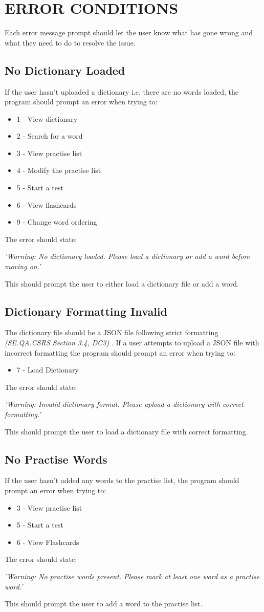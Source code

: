 \documentclass{project}
\begin{document}
\section{ERROR CONDITIONS}
Each error message prompt should let the user know what has gone wrong and what they need to do to resolve the issue.
\subsection{No Dictionary Loaded}
If the user hasn't uploaded a dictionary i.e. there are no words loaded, the program should prompt an error when trying to:
\begin{itemize}
	\item 1 - View dictionary
	\item 2 - Search for a word
	\item 3 - View practise list
	\item 4 - Modify the practise list
	\item 5 - Start a test
	\item 6 - View flashcards
	\item 9 - Change word ordering
\end{itemize}
The error should state:
\begin{center}
	\emph{'Warning: No dictionary loaded. Please load a dictionary or add a word before moving on.'}
\end{center}
This should prompt the user to either load a dictionary file or add a word.
\subsection{Dictionary Formatting Invalid}
The dictionary file should be a JSON file following strict formatting \emph{(SE.QA.CSRS Section 3.4, DC3)}\cite{se.qa.csrs} . If a user attempts to upload a JSON file with incorrect formatting the program should prompt an error when trying to:
\begin{itemize}
	\item 7 - Load Dictionary
\end{itemize}
The error should state:
\begin{center}
	\emph{'Warning: Invalid dictionary format. Please upload a dictionary with correct formatting.'}
\end{center}
This should prompt the user to load a dictionary file with correct formatting.
\subsection{No Practise Words}
If the user hasn't added any words to the practise list, the program should prompt an error when trying to:
\begin{itemize}
	\item 3 - View practise list
	\item 5 - Start a test
	\item 6 - View Flashcards
	\end{itemize}
The error should state:
\begin{center}
	\emph{'Warning: No practise words present. Please mark at least one word as a practise word.'}
\end{center}
This should prompt the user to add a word to the practise list.
\end{document}
